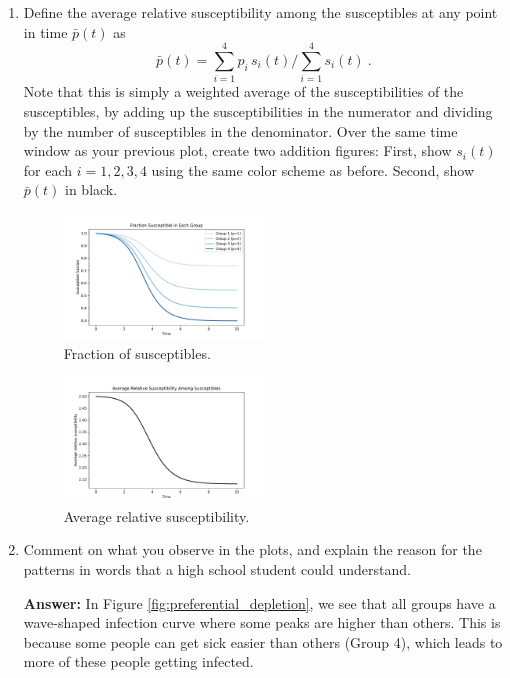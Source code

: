 \documentclass[11pt]{article}
\begin{document}
\begin{enumerate}
\begin{enumerate}[label=\alph*.]
	\item Define the average relative susceptibility among the susceptibles at any point in time $\bar{p}(t)$ as
	$$\bar{p}(t) = \displaystyle \sum_{i=1}^4 p_i\,s_i(t) \Bigg / \displaystyle \sum_{i=1}^4 s_i(t)\ .$$
	Note that this is simply a weighted average of the susceptibilities of the susceptibles, by adding up the susceptibilities in the numerator and dividing by the number of susceptibles in the denominator. Over the same time window as your previous plot, create two addition figures: First, show $s_i(t)$ for each $i=1, 2, 3, 4$ using the same color scheme as before. Second, show $\bar{p}(t)$ in black. 
	\begin{figure}[H]
		\centering
		\includegraphics[width=0.5\textwidth]{1e1.pdf}
		\caption{Fraction of susceptibles.}
		\label{fig:sus_fraction}
	\end{figure}
	\begin{figure}[H]
		\centering
		\includegraphics[width=0.5\textwidth]{1e2.pdf}
		\caption{Average relative susceptibility.}
		\label{fig:rel_sus}
	\end{figure}
	\item Comment on what you observe in the plots, and explain the reason for the patterns in words that a high school student could understand.
	\par
	\textbf{Answer:} In Figure \ref{fig:preferential_depletion}, we see that all groups have a wave-shaped infection curve where some peaks are higher than others.
	This is because some people can get sick easier than others (Group 4), which leads to more of these people getting infected.

\end{enumerate}
\end{enumerate}
\end{document}
